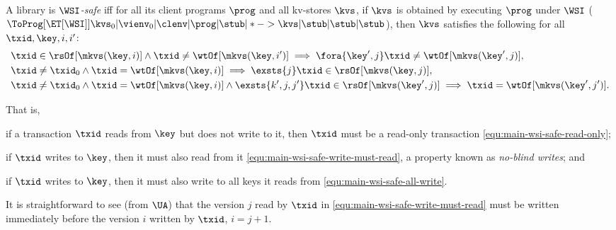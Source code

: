 \SpaceAboveDef
\begin{definition}
\label{def:main-body-wsi-safe}
A library is \emph{\(\WSI\)-safe}
iff for all its client programs $\prog$ and all kv-stores \( \kvs \), 
if $\kvs$ is  obtained by executing \( \prog \) under $\WSI$ 
(\ie \( \ToProg[{\ET[\WSI]}]{\kvs_0 | \vienv_0 | \clenv | \prog | \stub | * -> \kvs | \stub | \stub | \stub }\)),
then $\kvs$ satisfies the following for all $\txid, \key, i,i'$:
%
\begin{align}
     & \txid \in \rsOf[\mkvs(\key,i)] \land \txid \neq \wtOf[\mkvs(\key,i')]  \implies \fora{\key',j} \txid \neq \wtOf[\mkvs(\key',j)] , \label{equ:main-wsi-safe-read-only} \\
     & \txid \neq \txid_0 \land \txid = \wtOf[\mkvs(\key,i)] \implies \exsts{j} \txid \in \rsOf[\mkvs(\key,j)] , \label{equ:main-wsi-safe-write-must-read} \\
     & \txid \neq \txid_0 \land \txid = \wtOf[\mkvs(\key,i)] \land \exsts{k',j,j'} \txid \in \rsOf[\mkvs(\key',j)] \implies \txid = \wtOf[\mkvs(\key',j')] . \label{equ:main-wsi-safe-all-write}
\end{align}
%
\end{definition}

That is, 
\begin{enumerate*} 
\item if a transaction $\txid$ reads from $\key$ but does not write to it, 
then $\txid$ must be a read-only transaction \eqref{equ:main-wsi-safe-read-only}; 
\item if \( \txid \) writes to $\key$, then it must also read from it \eqref{equ:main-wsi-safe-write-must-read}, a property known as \emph{no-blind writes}; and
\item if \( \txid \) writes to $\key$, then it must also write to all keys it reads from \eqref{equ:main-wsi-safe-all-write}.
\end{enumerate*}
It is straightforward to see (from $\UA$) that the version $j$ read by \(
\txid \) in \eqref{equ:main-wsi-safe-write-must-read} must be written
immediately before the version $i$ written by \( \txid \), \ie \( i
= j {+} 1 \). 

